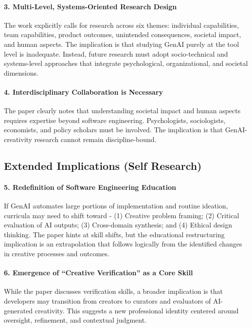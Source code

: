 \paragraph{3. Multi-Level, Systems-Oriented Research Design}
The work explicitly calls for research across six themes: individual capabilities, team capabilities, product outcomes, unintended consequences, societal impact, and human aspects. The implication is that studying GenAI purely at the tool level is inadequate. Instead, future research must adopt socio-technical and systems-level approaches that integrate psychological, organizational, and societal dimensions.

\paragraph{4. Interdisciplinary Collaboration is Necessary}
The paper clearly notes that understanding societal impact and human aspects requires expertise beyond software engineering. Psychologists, sociologists, economists, and policy scholars must be involved. The implication is that GenAI-creativity research cannot remain discipline-bound.

\subsection{Extended Implications (Self Research)}
\paragraph{5. Redefinition of Software Engineering Education}
If GenAI automates large portions of implementation and routine ideation, curricula may need to shift toward - (1) Creative problem framing; (2) Critical evaluation of AI outputs; (3) Cross-domain synthesis; and (4) Ethical design thinking. The paper hints at skill shifts, but the educational restructuring implication is an extrapolation that follows logically from the identified changes in creative processes and outcomes.

\paragraph{6. Emergence of “Creative Verification” as a Core Skill}
While the paper discusses verification skills, a broader implication is that developers may transition from creators to curators and evaluators of AI-generated creativity. This suggests a new professional identity centered around oversight, refinement, and contextual judgment.


